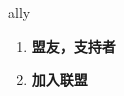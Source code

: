 
\begin{frame}
{\huge ally}
\begin{center}
\begin{enumerate}\Large
  \item \textbf{盟友，支持者}
  \item \textbf{加入联盟}
\end{enumerate}
\end{center}
\end{frame}
